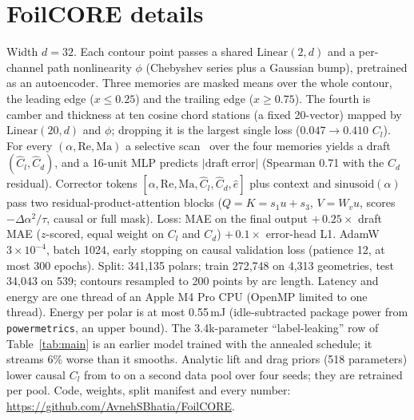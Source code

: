 \documentclass{article}
\begin{document}
\begin{table}[h]
\centering\footnotesize
\caption{Test MAE of the same 4k-parameter model as a filter (causal mask, ``stream'') and a smoother (full mask, ``smooth''), by training protocol, mean $\pm$ s.d.\ over 3 seeds (the data of Figure~\ref{fig:protocols}). No past target is input. Lower block: a 4.5k-parameter transformer corrector.}
\label{tab:transfer}
\setlength{\tabcolsep}{3pt}

\end{table}

\begin{table}[h]
\centering\footnotesize
\caption{Leak-fraction sweep (dual mask, fixed $q$, clean draft; mean of 3 seeds). Negative gap: the stream is more accurate.}
\label{tab:sweep}

\end{table}

\section{FoilCORE details}
\label{app:case}
Width $d{=}32$. Each contour point passes a shared $\mathrm{Linear}(2,d)$ and a per-channel path nonlinearity $\phi$ (Chebyshev series plus a Gaussian bump), pretrained as an autoencoder. Three memories are masked means over the whole contour, the leading edge ($x\le 0.25$) and the trailing edge ($x\ge 0.75$). The fourth is camber and thickness at ten cosine chord stations (a fixed 20-vector) mapped by $\mathrm{Linear}(20,d)$ and $\phi$; dropping it is the largest single loss ($0.047\rightarrow 0.410$ $C_l$). For every $(\alpha,\mathrm{Re},\mathrm{Ma})$ a selective scan~\citep{gu2024mamba,gu2022s4} over the four memories yields a draft $(\hat C_l,\hat C_d)$, and a 16-unit MLP predicts $|\mathrm{draft\ error}|$ (Spearman 0.71 with the $C_d$ residual). Corrector tokens $[\alpha,\mathrm{Re},\mathrm{Ma},\hat C_l,\hat C_d,\hat e]$ plus context and $\mathrm{sinusoid}(\alpha)$ pass two residual-product-attention blocks ($Q{=}K{=}s_1 u+s_3$, $V{=}W_v u$, scores $-\Delta\alpha^2/\tau$, causal or full mask). Loss: MAE on the final output $+\,0.25\times$ draft MAE ($z$-scored, equal weight on $C_l$ and $C_d$) $+\,0.1\times$ error-head L1. AdamW $3\times10^{-4}$, batch 1024, early stopping on causal validation loss (patience 12, at most 300 epochs). Split: 341,135 polars; train 272,748 on 4,313 geometries, test 34,043 on 539; contours resampled to 200 points by arc length. Latency and energy are one thread of an Apple M4 Pro CPU (OpenMP limited to one thread). Energy per polar is at most 0.55\,mJ (idle-subtracted package power from \texttt{powermetrics}, an upper bound). The 3.4k-parameter ``label-leaking'' row of Table~\ref{tab:main} is an earlier model trained with the annealed schedule; it streams 6\% worse than it smooths. Analytic lift and drag priors (518 parameters) lower causal $C_l$ from \BaseClAR{} to \PhysClAR{} on a second data pool over four seeds; they are retrained per pool. Code, weights, split manifest and every number: \url{https://github.com/AvnehSBhatia/FoilCORE}.
\end{document}
